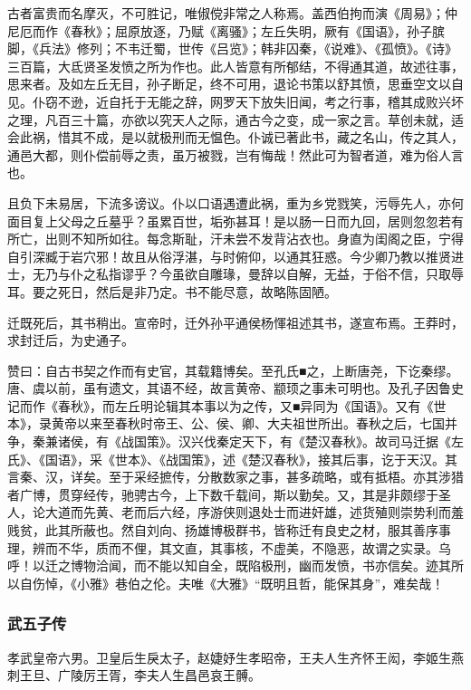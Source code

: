 \documentclass[]{article}
\begin{document}
古者富贵而名摩灭，不可胜记，唯俶傥非常之人称焉。盖西伯拘而演《周易》；仲尼厄而作《春秋》；屈原放逐，乃赋《离骚》；左丘失明，厥有《国语》，孙子膑脚，《兵法》修列；不韦迁蜀，世传《吕览》；韩非囚秦，《说难》、《孤愤》。《诗》三百篇，大氐贤圣发愤之所为作也。此人皆意有所郁结，不得通其道，故述往事，思来者。及如左丘无目，孙子断足，终不可用，退论书策以舒其愤，思垂空文以自见。仆窃不逊，近自托于无能之辞，网罗天下放失旧闻，考之行事，稽其成败兴坏之理，凡百三十篇，亦欲以究天人之际，通古今之变，成一家之言。草创未就，适会此祸，惜其不成，是以就极刑而无愠色。仆诚已著此书，藏之名山，传之其人，通邑大都，则仆偿前辱之责，虽万被戮，岂有悔哉！然此可为智者道，难为俗人言也。

且负下未易居，下流多谤议。仆以口语遇遭此祸，重为乡党戮笑，污辱先人，亦何面目复上父母之丘墓乎？虽累百世，垢弥甚耳！是以肠一日而九回，居则忽忽若有所亡，出则不知所如往。每念斯耻，汗未尝不发背沾衣也。身直为闺阁之臣，宁得自引深臧于岩穴邪！故且从俗浮湛，与时俯仰，以通其狂惑。今少卿乃教以推贤进士，无乃与仆之私指谬乎？今虽欲自雕瑑，曼辞以自解，无益，于俗不信，只取辱耳。要之死日，然后是非乃定。书不能尽意，故略陈固陋。

迁既死后，其书稍出。宣帝时，迁外孙平通侯杨惲祖述其书，遂宣布焉。王莽时，求封迁后，为史通子。

赞曰：自古书契之作而有史官，其载籍博矣。至孔氏■之，上断唐尧，下讫秦缪。唐、虞以前，虽有遗文，其语不经，故言黄帝、颛顼之事未可明也。及孔子因鲁史记而作《春秋》，而左丘明论辑其本事以为之传，又■异同为《国语》。又有《世本》，录黄帝以来至春秋时帝王、公、侯、卿、大夫祖世所出。春秋之后，七国并争，秦兼诸侯，有《战国策》。汉兴伐秦定天下，有《楚汉春秋》。故司马迁据《左氏》、《国语》，采《世本》、《战国策》，述《楚汉春秋》，接其后事，讫于天汉。其言秦、汉，详矣。至于采经摭传，分散数家之事，甚多疏略，或有抵梧。亦其涉猎者广博，贯穿经传，驰骋古今，上下数千载间，斯以勤矣。又，其是非颇缪于圣人，论大道而先黄、老而后六经，序游侠则退处士而进奸雄，述货殖则崇势利而羞贱贫，此其所蔽也。然自刘向、扬雄博极群书，皆称迁有良史之材，服其善序事理，辨而不华，质而不俚，其文直，其事核，不虚美，不隐恶，故谓之实录。乌呼！以迁之博物洽闻，而不能以知自全，既陷极刑，幽而发愤，书亦信矣。迹其所以自伤悼，《小雅》巷伯之伦。夫唯《大雅》``既明且哲，能保其身''，难矣哉！

\hypertarget{header-n4782}{%
\subsubsection{武五子传}\label{header-n4782}}

孝武皇帝六男。卫皇后生戾太子，赵婕妤生孝昭帝，王夫人生齐怀王闳，李姬生燕刺王旦、广陵厉王胥，李夫人生昌邑哀王髆。
\end{document}

